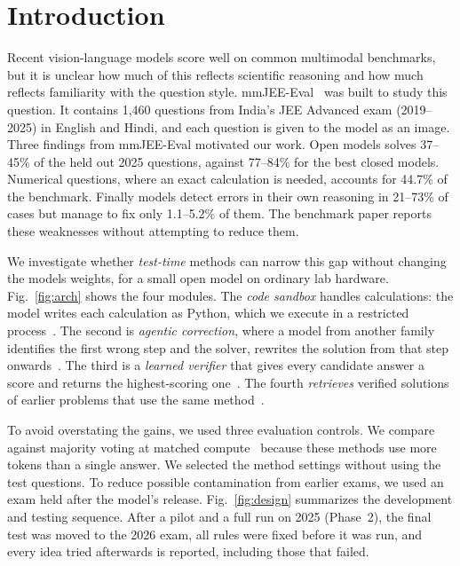 \documentclass[conference]{IEEEtran}
\begin{document}
\section{Introduction}
Recent vision-language models score well on common multimodal benchmarks, but it is unclear how much of this reflects scientific reasoning and how much reflects
familiarity with the question style. mmJEE-Eval~\cite{mmjee} was built to study this question.
It contains 1{,}460 questions from India's JEE Advanced exam (2019--2025) in English and Hindi,
and each question is given to the model as an image. Three findings from mmJEE-Eval motivated our work. Open models solves 37--45\% of the held out 2025 questions, against 77--84\% for the
best closed models. Numerical questions, where an exact calculation is needed, accounts for
44.7\% of the benchmark. Finally models detect errors in their own reasoning in 21--73\% of
cases but manage to fix only 1.1--5.2\% of them. The benchmark paper reports these weaknesses
without attempting to reduce them.

We investigate whether \emph{test-time} methods can narrow this gap without changing the models weights, for a small open model on ordinary lab hardware. Fig.~\ref{fig:arch} shows the four modules. The \emph{code sandbox} handles calculations: the model
writes each calculation as Python, which we execute in a restricted process~\cite{pot,pal}. The
second is \emph{agentic correction}, where a model from another family identifies the first wrong
step and the solver, rewrites the solution from that step onwards~\cite{selfrefine,critic}. The
third is a \emph{learned verifier} that gives every candidate answer a score and returns the
highest-scoring one~\cite{cobbe,xgboost}. The fourth \emph{retrieves} verified solutions of earlier
problems that use the same method~\cite{rag}.

To avoid overstating the gains, we used three evaluation controls. We compare against majority voting at matched compute~\cite{selfconsistency} because these methods use more tokens than a single answer. We selected the method settings without using the test questions. To reduce possible contamination from earlier exams, we used an exam held after the model's release. Fig.~\ref{fig:design} summarizes the development and testing sequence. After a pilot and a
full run on 2025 (Phase~2), the final test was moved to the 2026 exam, all rules were fixed
before it was run, and every idea tried afterwards is reported, including those that failed.
\end{document}
